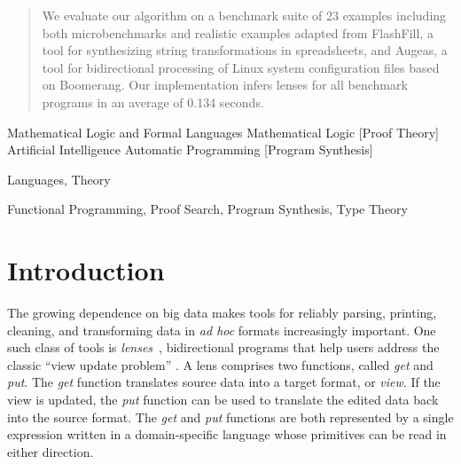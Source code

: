 \documentclass[numbers,10pt,preprint\ifanon ,nocopyrightspace\fi]{sigplanconf}
\begin{document}
\begin{abstract}
We evaluate our algorithm on a benchmark suite of 23 examples including
both microbenchmarks and realistic examples adapted from FlashFill, a tool
for synthesizing string transformations in spreadsheets, and Augeas, a tool
for bidirectional processing of Linux system configuration files based on
Boomerang.  Our implementation infers lenses for all benchmark programs in
an average of 0.134 seconds.
\end{abstract}

\ifanon\else
{}
{Mathematical Logic and Formal Languages}
{Mathematical Logic}
[Proof Theory]
{Artificial Intelligence}
{Automatic Pro\-gramming}
[Program Synthesis]

\terms Languages, Theory

\keywords Functional Programming, Proof Search, Program Synthesis, Type Theory
\fi

\section{Introduction}

The growing dependence on big data makes tools for reliably parsing,
printing, cleaning, and transforming data in {\em ad hoc} formats
increasingly important.  One such class of tools is
\emph{lenses}~\cite{Focal2005-long}, bidirectional
programs that help users address the 
classic ``view update problem'' \cite{Bancilhon81, Dayal82}.  A lens
comprises two functions, called 
\emph{get} and \emph{put}.  The \emph{get} function translates source data
into a target format, or \emph{view}.  If the view is updated, the
\emph{put} function can be used to translate the edited data back into the
source format.  The \emph{get} and \emph{put} functions are both represented
by a single expression written in a domain-specific language whose
primitives can be read in either direction.
\end{document}
